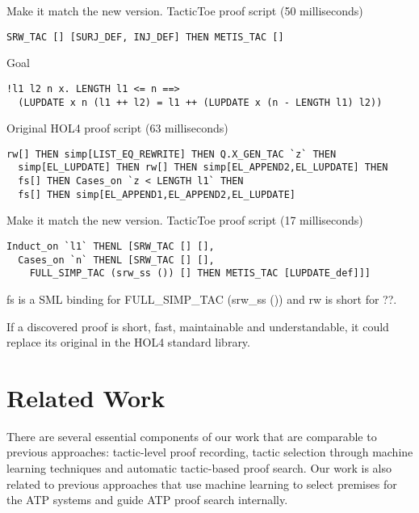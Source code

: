 \documentclass[runningheads,a4paper,draft]{svjour3}
\def\holfour{\textsf{HOL4}\xspace}
\def\sml{\textsf{SML}\xspace}
\def\tactictoe{\textsf{TacticToe}\xspace}
\begin{document}
Make it match the new version.
\tactictoe proof script (50 milliseconds)
\begin{lstlisting}[language=SMLSmall,frame=tb]
SRW_TAC [] [SURJ_DEF, INJ_DEF] THEN METIS_TAC []
\end{lstlisting}


Goal
\begin{lstlisting}[language=SMLSmall,frame=tb]
!l1 l2 n x. LENGTH l1 <= n ==> 
  (LUPDATE x n (l1 ++ l2) = l1 ++ (LUPDATE x (n - LENGTH l1) l2))
\end{lstlisting}

\vspace{5mm}

Original \holfour proof script (63 milliseconds)
\begin{lstlisting}[language=SMLSmall,frame=tb]
  rw[] THEN simp[LIST_EQ_REWRITE] THEN Q.X_GEN_TAC `z` THEN
  simp[EL_LUPDATE] THEN rw[] THEN simp[EL_APPEND2,EL_LUPDATE] THEN
  fs[] THEN Cases_on `z < LENGTH l1` THEN
  fs[] THEN simp[EL_APPEND1,EL_APPEND2,EL_LUPDATE]
\end{lstlisting}


\vspace{5mm}
Make it match the new version.
\tactictoe proof script (17 milliseconds)
\begin{lstlisting}[language=SMLSmall,frame=tb]
Induct_on `l1` THENL [SRW_TAC [] [],
  Cases_on `n` THENL [SRW_TAC [] [],
    FULL_SIMP_TAC (srw_ss ()) [] THEN METIS_TAC [LUPDATE_def]]]
\end{lstlisting}
fs is a \sml binding for FULL\_SIMP\_TAC (srw\_ss ()) and rw is short for ??.



If a discovered proof is short, fast, maintainable and 
understandable, it could replace its original in the \holfour standard library.


\section{Related Work}
There are several essential components of our work that are comparable to 
previous approaches: tactic-level proof recording, tactic 
selection through machine learning techniques and automatic tactic-based proof 
search. Our work is also related to previous approaches that use machine 
learning to select premises for the ATP systems and guide ATP proof search 
internally.
\end{document}
